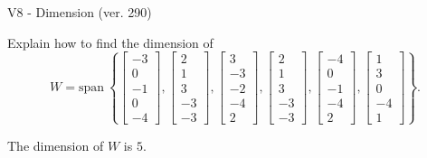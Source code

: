 \begin{exercise}
  \begin{exerciseTitle}V8 - Dimension (ver. 290)\end{exerciseTitle}
  \begin{exerciseStatement}
    Explain how to find the dimension of 
\[W=\mathrm{span}\ \left\{\left[\begin{array}{r}
-3 \\
0 \\
-1 \\
0 \\
-4
\end{array}\right] , \left[\begin{array}{r}
2 \\
1 \\
3 \\
-3 \\
-3
\end{array}\right] , \left[\begin{array}{r}
3 \\
-3 \\
-2 \\
-4 \\
2
\end{array}\right] , \left[\begin{array}{r}
2 \\
1 \\
3 \\
-3 \\
-3
\end{array}\right] , \left[\begin{array}{r}
-4 \\
0 \\
-1 \\
-4 \\
2
\end{array}\right] , \left[\begin{array}{r}
1 \\
3 \\
0 \\
-4 \\
1
\end{array}\right]\right\}.\]



  \end{exerciseStatement}
  \begin{exerciseAnswer}
   The dimension of \(W\) is  \(5\).
  


  \end{exerciseAnswer}
\end{exercise}
